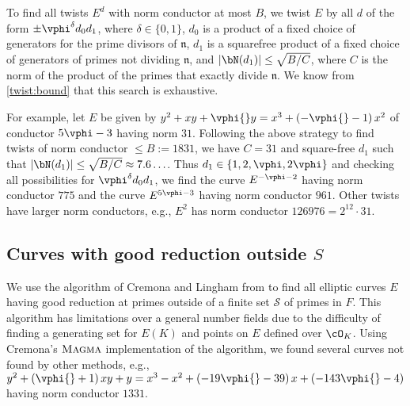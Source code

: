 \documentclass{amsart}
\newcommand{\n}{\mathfrak{n}}
\begin{document}
To find all twists $E^d$ with norm conductor at most $B$, we twist $E$
by all $d$ of the form $\pm \vphi^{\delta} d_0 d_1$, where $\delta\in
\{0,1\}$, $d_0$ is a product of a fixed choice of generators for
the prime divisors of $\n$, 
$d_1$ is a squarefree product of a fixed choice of generators of 
primes not dividing $\n$, and
$|\bN(d_1)| \leq \sqrt{B/C}$, where $C$ is the norm of the product of
the primes that exactly divide $\n$. We know from \ref{twist:bound} that 
this search is exhaustive.


For example, let $E$ be given by $y^2 + xy + \vphi{}y = x^3 +
\left(-\vphi{} - 1\right)x^2 $ of conductor $5\vphi - 3$ having norm $31$.
Following the above strategy to find twists of norm conductor $\leq
B := 1831$, we have $C=31$ and square-free $d_1$ such that
$|\bN(d_1)| \leq \sqrt{B/C} \approx 7.6\ldots$. Thus $d_1 \in \{1, 2,
\vphi, 2\vphi\}$ and checking all possibilities for
$\vphi^{\delta} d_0 d_1$, we find the curve $E^{-\vphi-2}$ having
norm conductor $775$ and the curve $E^{5\vphi-3}$ having norm conductor
$961$. Other twists have larger norm conductors, e.g., $E^2$ has norm
conductor $126976=2^{12}\cdot 31$.


\subsection{Curves with good reduction outside $S$}\label{sec:cremona-lingham}

We use the algorithm of Cremona and Lingham from
\cite{cremona-lingham} to find all elliptic curves $E$ having good
reduction at primes outside of a finite set $\mathcal{S}$ of primes in
$F$. This algorithm has limitations over a general number
fields due to the difficulty of finding a generating set for $E(K)$ and
points on $E$ defined over $\cO_K$.
Using Cremona's $\textsc{Magma}$ implementation of the algorithm, we 
found several curves not found by other methods, e.g.,  
$y^2 + \left(\vphi{} +  1\right)xy + y = x^3 -x^2 + \left(-19 \vphi{} - 
 39\right)x + \left(-143 \vphi{} - 4\right)$ 
having norm conductor $1331$.
\end{document}
